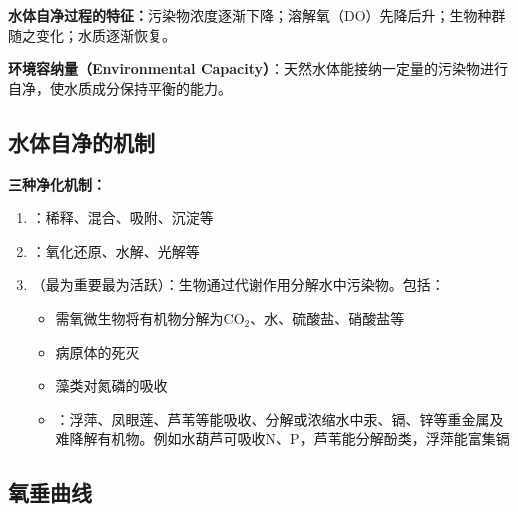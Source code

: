 \textbf{水体自净过程的特征：}污染物浓度逐渐下降；溶解氧（DO）先降后升；生物种群随之变化；水质逐渐恢复。

\textbf{环境容纳量（Environmental Capacity）}：天然水体能接纳一定量的污染物进行自净，使水质成分保持平衡的能力。

\subsection{水体自净的机制}

\begin{keybox}
\textbf{三种净化机制：}

\begin{enumerate}[leftmargin=*]
    \item {}：稀释、混合、吸附、沉淀等
    \item {}：氧化还原、水解、光解等
    \item {}（最为重要最为活跃）：生物通过代谢作用分解水中污染物。包括：
    \begin{itemize}
        \item 需氧微生物将有机物分解为CO$_2$、水、硫酸盐、硝酸盐等
        \item 病原体的死灭
        \item 藻类对氮磷的吸收
        \item {}：浮萍、凤眼莲、芦苇等能吸收、分解或浓缩水中汞、镉、锌等重金属及难降解有机物。例如水葫芦可吸收N、P，芦苇能分解酚类，浮萍能富集镉
    \end{itemize}
\end{enumerate}
\end{keybox}

\subsection{氧垂曲线}

